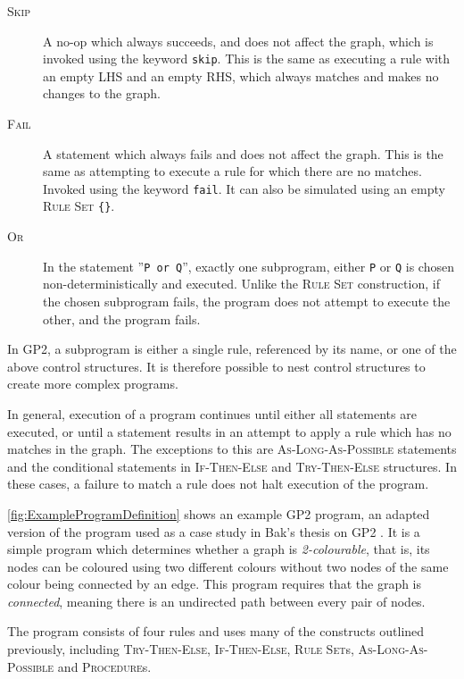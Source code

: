 \documentclass[authoryearcitations]{UoYCSproject}
\begin{document}
\begin{description}
    \item[\textsc{Skip}]
    A no-op which always succeeds, and does not affect the graph, which is invoked
    using the keyword \texttt{skip}. This is the same as executing a rule with an
    empty LHS and an empty RHS, which always matches and makes no changes to the graph.

    \item[\textsc{Fail}]
    A statement which always fails and does not affect the graph. This is the same
    as attempting to execute a rule for which there are no matches. Invoked using
    the keyword \texttt{fail}. It can also be simulated using an empty
    \textsc{Rule Set} \texttt{\{\}}.

    \item[\textsc{Or}]
    In the statement ''\texttt{P or Q}'', exactly one subprogram, either \texttt{P}
    or \texttt{Q} is chosen non-deterministically and executed. Unlike the
    \textsc{Rule Set} construction, if the chosen subprogram fails, the program does
    not attempt to execute the other, and the program fails.
\end{description}

In GP2, a subprogram is either a single rule, referenced by its name, or one of
the above control structures. It is therefore possible to nest control structures
to create more complex programs.

In general, execution of a program continues until either all statements are
executed, or until a statement results in an attempt to apply a rule which has
no matches in the graph. The exceptions to this are \textsc{As-Long-As-Possible}
statements and the conditional statements in \textsc{If-Then-Else} and
\textsc{Try-Then-Else} structures. In these cases, a failure to match a rule
does not halt execution of the program.

\autoref{fig:ExampleProgramDefinition} shows an example GP2 program, an adapted
version of the program used as a case study in Bak's thesis on GP2 \citep[p.126]{bak2015}.
It is a simple program which determines whether a graph is \emph{2-colourable},
that is, its nodes can be coloured using two different colours without two nodes
of the same colour being connected by an edge. This program requires that the
graph is \emph{connected}, meaning there is an undirected path between every pair
of nodes.

The program consists of four rules and uses many of the constructs outlined
previously, including \textsc{Try-Then-Else}, \textsc{If-Then-Else},
\textsc{Rule Set}s, \textsc{As-Long-As-Possible} and \textsc{Procedure}s.
\end{document}
